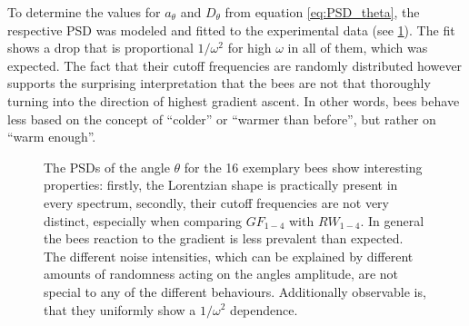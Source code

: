 To determine the values for $a_{\theta}$ and $D_{\theta}$ from equation \ref{eq:PSD_theta}, the respective PSD was modeled and fitted to the experimental data (see \ref{fig:PSD_angle}).
The fit shows a drop that is proportional $1/\omega^{2}$ for high $\omega$ in all of them, which was expected. The fact that their cutoff frequencies are randomly distributed however supports the surprising interpretation that the bees are not that thoroughly turning into the direction of highest gradient ascent. In other words, bees behave less based on the concept of ``colder'' or ``warmer than before'', but rather on ``warm enough''. %

\begin{figure}%
    \centering
    \caption{The PSDs of the angle $\theta$ for the 16 exemplary bees show interesting properties: firstly, the Lorentzian shape is practically present in every spectrum,  secondly, their cutoff frequencies are not very distinct, especially when comparing $GF_{1-4}$ with $RW_{1-4}$. In general the bees reaction to the gradient is less prevalent than expected. The different noise intensities, which can be explained by different amounts of randomness acting on the angles amplitude, are not special to any of the different behaviours. Additionally observable is, that they uniformly show a $1/\omega^{2}$ dependence.}
    \label{fig:PSD_angle}
\end{figure}

